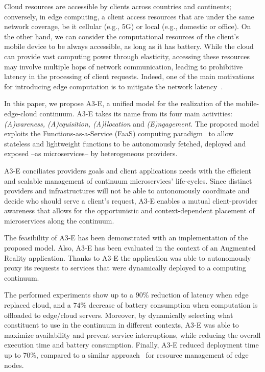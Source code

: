 Cloud resources are accessible by clients across countries and continents; conversely, in edge computing, a client access resources that are under the same network coverage, be it cellular (e.g., 5G) or local (e.g., domestic or office). On the other hand, we can consider the computational resources of the client's mobile device to be always accessible, as long as it has battery. While the cloud can provide vast computing power through elasticity, accessing these resources may involve multiple hops of network communication, leading to prohibitive latency in the processing of client requests. Indeed, one of the main motivations for introducing edge computation is to mitigate the network latency~\cite{Shi:2016}.

In this paper, we propose A3-E, a unified model for the realization of the mobile-edge-cloud continuum. A3-E takes its name from its four main activities: \textit{(A)wareness, (A)cquisition, (A)llocation} and \textit{(E)ngagement}. The proposed model exploits the Functions-as-a-Service (FaaS) computing paradigm~\cite{Hendrickson:2016,baldini2017serverless,GarrigaMendonca2017} to allow stateless and lightweight functions to be autonomously fetched, deployed and exposed --as microservices-- by heterogeneous providers. 

A3-E conciliates providers goals and client applications needs with the efficient and scalable management of continuum microservices' life-cycles. Since distinct providers and infrastructures will not be able to autonomously coordinate and decide who should serve a client's request, A3-E enables a mutual client-provider awareness that allows for the opportunistic and context-dependent placement of microservices along the continuum.

The feasibility of A3-E has been demonstrated with an implementation of the proposed model. Also, A3-E has been evaluated in the context of an Augmented Reality application. Thanks to A3-E the application was able to autonomously proxy its requests to services that were dynamically deployed to a computing continuum. 


The performed experiments show up to a $90$\% reduction of latency when edge replaced cloud, and a $74$\% decrease of battery consumption when computation is offloaded 
to edge/cloud servers. Moreover, by dynamically selecting what constituent to use in the continuum in different contexts, 
A3-E was able to maximize availability and prevent service interruptions, while reducing the overall execution time and battery consumption. Finally, A3-E reduced deployment time up to 70\%, compared to a similar approach~\cite{wang2017enorm} for resource management of edge nodes.


